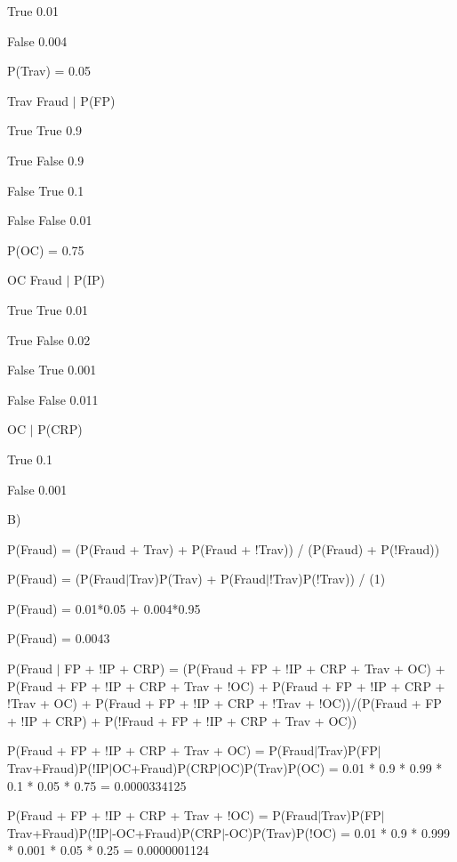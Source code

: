\documentclass{article}
\begin{document}
True	  0.01

False  0.004

\hspace{5mm}

P(Trav) = 0.05

\hspace{5mm}

Trav  Fraud $|$ P(FP)

True  True	      0.9

True	 False    0.9

False  True     0.1

False  False   0.01

\hspace{5mm}

P(OC) = 0.75

\hspace{5mm}

OC		Fraud $|$	P(IP)

True	True	0.01

True	False	0.02

False	True	0.001

False	False	0.011

\hspace{5mm}

OC 	$|$ 	P(CRP)

True	0.1

False	0.001

\hspace{5mm}

B)

	P(Fraud) = (P(Fraud + Trav) + P(Fraud + !Trav)) / (P(Fraud) + P(!Fraud))
	
	P(Fraud) = (P(Fraud$|$Trav)P(Trav) + P(Fraud$|$!Trav)P(!Trav)) / (1)
	
	P(Fraud) = 0.01*0.05 + 0.004*0.95
	
	P(Fraud) = 0.0043
	
	P(Fraud $|$ FP + !IP + CRP) = (P(Fraud + FP + !IP + CRP + Trav + OC) + P(Fraud + FP + !IP + CRP + Trav + !OC) + P(Fraud + FP + !IP + CRP + !Trav + OC) + P(Fraud + FP + !IP + CRP + !Trav + !OC))/(P(Fraud + FP + !IP + CRP) + P(!Fraud + FP + !IP + CRP + Trav + OC))
	
	P(Fraud + FP + !IP + CRP + Trav + OC) = P(Fraud$|$Trav)P(FP$|$Trav+Fraud)P(!IP$|$OC+Fraud)P(CRP$|$OC)P(Trav)P(OC) = 0.01 * 0.9 * 0.99 * 0.1 * 0.05 * 0.75 = 0.0000334125
	
	P(Fraud + FP + !IP + CRP + Trav + !OC) = P(Fraud$|$Trav)P(FP$|$Trav+Fraud)P(!IP$|$-OC+Fraud)P(CRP$|$-OC)P(Trav)P(!OC) = 0.01 * 0.9 * 0.999 * 0.001 * 0.05 * 0.25 = 0.0000001124
	
\end{document}
